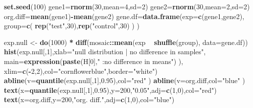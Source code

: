 \documentclass[12pt,]{krantz}
\newenvironment{Shaded}{\begin{snugshade}}{\end{snugshade}}
\newcommand{\DataTypeTok}[1]{\textcolor[rgb]{0.13,0.29,0.53}{#1}}
\newcommand{\DecValTok}[1]{\textcolor[rgb]{0.00,0.00,0.81}{#1}}
\newcommand{\FloatTok}[1]{\textcolor[rgb]{0.00,0.00,0.81}{#1}}
\newcommand{\KeywordTok}[1]{\textcolor[rgb]{0.13,0.29,0.53}{\textbf{#1}}}
\newcommand{\NormalTok}[1]{#1}
\newcommand{\OperatorTok}[1]{\textcolor[rgb]{0.81,0.36,0.00}{\textbf{#1}}}
\newcommand{\StringTok}[1]{\textcolor[rgb]{0.31,0.60,0.02}{#1}}
\theoremstyle{definition}
\theoremstyle{definition}
\theoremstyle{definition}
\theoremstyle{remark}
\begin{document}
\begin{Shaded}
\begin{Highlighting}[]
\KeywordTok{set.seed}\NormalTok{(}\DecValTok{100}\NormalTok{)}
\NormalTok{gene1=}\KeywordTok{rnorm}\NormalTok{(}\DecValTok{30}\NormalTok{,}\DataTypeTok{mean=}\DecValTok{4}\NormalTok{,}\DataTypeTok{sd=}\DecValTok{2}\NormalTok{)}
\NormalTok{gene2=}\KeywordTok{rnorm}\NormalTok{(}\DecValTok{30}\NormalTok{,}\DataTypeTok{mean=}\DecValTok{2}\NormalTok{,}\DataTypeTok{sd=}\DecValTok{2}\NormalTok{)}
\NormalTok{org.diff=}\KeywordTok{mean}\NormalTok{(gene1)}\OperatorTok{-}\KeywordTok{mean}\NormalTok{(gene2)}
\NormalTok{gene.df=}\KeywordTok{data.frame}\NormalTok{(}\DataTypeTok{exp=}\KeywordTok{c}\NormalTok{(gene1,gene2),}
                  \DataTypeTok{group=}\KeywordTok{c}\NormalTok{( }\KeywordTok{rep}\NormalTok{(}\StringTok{"test"}\NormalTok{,}\DecValTok{30}\NormalTok{),}\KeywordTok{rep}\NormalTok{(}\StringTok{"control"}\NormalTok{,}\DecValTok{30}\NormalTok{) ) )}


\NormalTok{exp.null <-}\StringTok{ }\KeywordTok{do}\NormalTok{(}\DecValTok{1000}\NormalTok{) }\OperatorTok{*}\StringTok{ }\KeywordTok{diff}\NormalTok{(mosaic}\OperatorTok{::}\KeywordTok{mean}\NormalTok{(exp }\OperatorTok{~}\StringTok{ }\KeywordTok{shuffle}\NormalTok{(group), }\DataTypeTok{data=}\NormalTok{gene.df))}
\KeywordTok{hist}\NormalTok{(exp.null[,}\DecValTok{1}\NormalTok{],}\DataTypeTok{xlab=}\StringTok{"null distribution | no difference in samples"}\NormalTok{,}
     \DataTypeTok{main=}\KeywordTok{expression}\NormalTok{(}\KeywordTok{paste}\NormalTok{(H[}\DecValTok{0}\NormalTok{],}\StringTok{" :no difference in means"}\NormalTok{) ),}
     \DataTypeTok{xlim=}\KeywordTok{c}\NormalTok{(}\OperatorTok{-}\DecValTok{2}\NormalTok{,}\DecValTok{2}\NormalTok{),}\DataTypeTok{col=}\StringTok{"cornflowerblue"}\NormalTok{,}\DataTypeTok{border=}\StringTok{"white"}\NormalTok{)}
\KeywordTok{abline}\NormalTok{(}\DataTypeTok{v=}\KeywordTok{quantile}\NormalTok{(exp.null[,}\DecValTok{1}\NormalTok{],}\FloatTok{0.95}\NormalTok{),}\DataTypeTok{col=}\StringTok{"red"}\NormalTok{ )}
\KeywordTok{abline}\NormalTok{(}\DataTypeTok{v=}\NormalTok{org.diff,}\DataTypeTok{col=}\StringTok{"blue"}\NormalTok{ )}
\KeywordTok{text}\NormalTok{(}\DataTypeTok{x=}\KeywordTok{quantile}\NormalTok{(exp.null[,}\DecValTok{1}\NormalTok{],}\FloatTok{0.95}\NormalTok{),}\DataTypeTok{y=}\DecValTok{200}\NormalTok{,}\StringTok{"0.05"}\NormalTok{,}\DataTypeTok{adj=}\KeywordTok{c}\NormalTok{(}\DecValTok{1}\NormalTok{,}\DecValTok{0}\NormalTok{),}\DataTypeTok{col=}\StringTok{"red"}\NormalTok{)}
\KeywordTok{text}\NormalTok{(}\DataTypeTok{x=}\NormalTok{org.diff,}\DataTypeTok{y=}\DecValTok{200}\NormalTok{,}\StringTok{"org. diff."}\NormalTok{,}\DataTypeTok{adj=}\KeywordTok{c}\NormalTok{(}\DecValTok{1}\NormalTok{,}\DecValTok{0}\NormalTok{),}\DataTypeTok{col=}\StringTok{"blue"}\NormalTok{)}
\end{Highlighting}
\end{Shaded}
\end{document}
